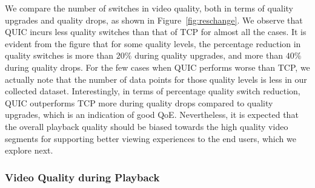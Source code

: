 We compare the number of switches in video quality, both in terms of quality upgrades and quality drops, as shown in Figure~\ref{fig:reschange}.
We observe that QUIC incurs less quality switches than that of TCP for almost all the cases. 
It is evident from the figure that for some quality levels, the percentage reduction in quality switches is more than $20\%$ during quality upgrades, and more than $40\%$ during quality drops. For the few cases when QUIC performs worse than TCP, we actually note that the number of data points for those quality levels is less in our collected dataset. Interestingly, in terms of percentage quality switch reduction, QUIC outperforms TCP  more during quality drops compared to quality upgrades, which is an indication of good QoE.  Nevertheless, it is expected that the overall playback quality should be biased towards the high quality video segments for supporting better viewing experiences to the end users, which we explore next. 

\subsubsection{Video Quality during Playback}

